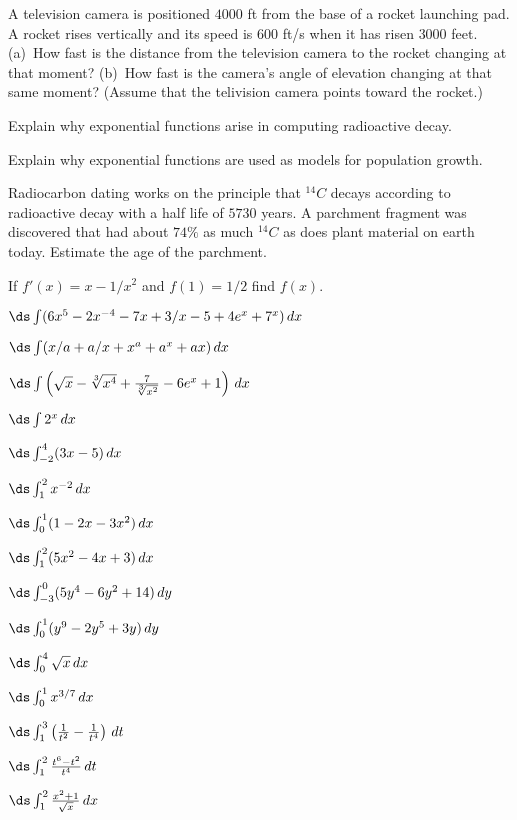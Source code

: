 \begin{multicols}{2}
  \problem A television camera is positioned $4000$ ft from the base of a
  rocket launching pad.  A rocket rises vertically and its speed is $600$
  ft/s when it has risen $3000$ feet.  (a)~How fast is the distance from the
  television camera to the rocket changing at that moment?  (b)~How fast is
  the camera's angle of elevation changing at that same moment?  (Assume that
  the telivision camera points toward the rocket.)




  \problem Explain why exponential functions arise in computing radioactive
  decay.



  \problem Explain why exponential functions are used as models for
  population growth.



  \problem Radiocarbon dating works on the principle that $^{14}C$ decays
  according to radioactive decay with a half life of $5730$ years.  A
  parchment fragment was discovered that had about $74\%$ as much $^{14}C$ as
  does plant material on earth today.  Estimate the age of the parchment.


  \problem If $f'(x)=x-1/x^2$ and $f(1)=1/2$ find $f(x)$.


  \problem $\ds \int (6x^5-2x^{-4}-7x+3/x-5+4e^x+7^x) \,dx$


  \problem $\ds \int (x/a+a/x+x^a+a^x+ax) \,dx $


  \problem $\ds\int \left(\sqrt{x}- \root 3\of {x^4}+\frac{7}{ {\root 3 \of
  {x^2}}} -6e^x+1\right)\,dx $


  \problem$\ds\int 2^x \,dx$


  \problem$\ds\int^4_{-2} (3x-5) \,dx$


  \problem$\ds \int^2_{1} x^{-2} \,dx$


  \problem$\ds \int^1_{0} (1-2x-3x^2) \,dx$


  \problem$\ds \int^2_1 (5x^2-4x+3) \,dx$


  \problem$\ds \int^0_{-3} (5y^4-6y^2+14) \,dy$


  \problem$\ds \int^1_{0} (y^9-2y^5+3y) \,dy$


  \problem$\ds \int^4_0 \sqrt{x} \,dx$


  \problem$\ds \int^1_0 x^{3/7} \,dx$


  \problem$\ds \int^3_1 \left(\frac{1}{ t^2}-\frac{1}{ t^4}\right) \,dt$


  \problem$\ds \int^2_1 \frac{t^6-t^2}{ t^4} \,dt$


  \problem$\ds \int^2_1 \frac{x^2+1}{ \sqrt{x}} \,dx$



\end{multicols}
